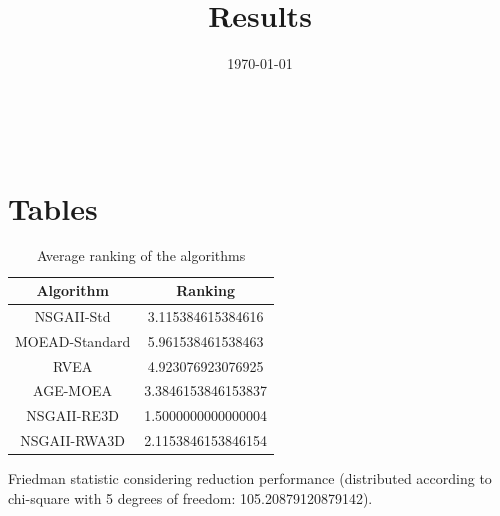 \documentclass{article}
\title{Results}
\author{}
\date{\today}
\begin{document}
\oddsidemargin 0in \topmargin 0in\maketitle
\
\section{Tables}
\begin{table}[!htp]
\centering
\caption{Average ranking of the algorithms}
\begin{tabular}{c|c}
Algorithm&Ranking\\
\hline
NSGAII-Std&3.115384615384616\\
MOEAD-Standard&5.961538461538463\\
RVEA&4.923076923076925\\
AGE-MOEA&3.3846153846153837\\
NSGAII-RE3D&1.5000000000000004\\
NSGAII-RWA3D&2.1153846153846154\\
\end{tabular}
\end{table}


Friedman statistic considering reduction performance (distributed according to chi-square with 5 degrees of freedom: 105.20879120879142).
\end{document}
